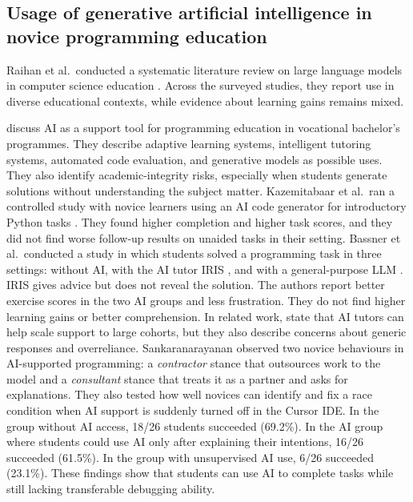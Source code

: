 \documentclass{article}
\begin{document}
\subsection{Usage of generative artificial intelligence in novice programming education}
Raihan et al.\ conducted a systematic literature review on large language models in computer science education \citep{RaihanEtAl2025LLMCSeduSLR}. Across the surveyed studies, they report use in diverse educational contexts, while evidence about learning gains remains mixed.\par
\citet{RozputniaEtAl2025AISupportVocationalProgramming} discuss AI as a support tool for programming education in vocational bachelor's programmes. They describe adaptive learning systems, intelligent tutoring systems, automated code evaluation, and generative models as possible uses. They also identify academic-integrity risks, especially when students generate solutions without understanding the subject matter.
Kazemitabaar et al.\ ran a controlled study with novice learners using an AI code generator for introductory Python tasks \citep{KazemitabaarEtAl2023AICodeGenerators}. They found higher completion and higher task scores, and they did not find worse follow-up results on unaided tasks in their setting.
Bassner et al.\ conducted a study in which students solved a programming task in three settings: without AI, with the AI tutor IRIS \citep{bassner2024iris}, and with a general-purpose LLM \citep{BassnerEtAl2026LessStress}. IRIS gives advice but does not reveal the solution. The authors report better exercise scores in the two AI groups and less frustration. They do not find higher learning gains or better comprehension. In related work, \citet{frankford2024aitutoring} state that AI tutors can help scale support to large cohorts, but they also describe concerns about generic responses and overreliance.
%
Sankaranarayanan \citep{Sankaranarayanan2026EpistemicDebt} observed two novice behaviours in AI-supported programming: a \emph{contractor} stance that outsources work to the model and a \emph{consultant} stance that treats it as a partner and asks for explanations. They also tested how well novices can identify and fix a race condition when AI support is suddenly turned off in the Cursor IDE. In the group without AI access, 18/26 students succeeded (69.2\%). In the AI group where students could use AI only after explaining their intentions, 16/26 succeeded (61.5\%). In the group with unsupervised AI use, 6/26 succeeded (23.1\%). These findings show that students can use AI to complete tasks while still lacking transferable debugging ability.
\end{document}
